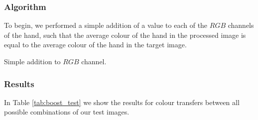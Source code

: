 \subsubsection*{Algorithm}
To begin, we performed a simple addition of a value to each of the $RGB$ channels of the hand, such that the average colour of the hand in the processed image is equal to the average colour of the hand in the target image.




\begin{algorithm}[H]
\caption{Simple addition to $RGB$ channel.}
\label{eq:boost_algo}
\end{algorithm}



\subsubsection*{Results}
In Table \ref{tab:boost_test} we show the results for colour transfers between all possible combinations of our test images.


